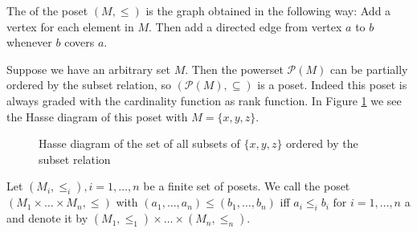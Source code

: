 \begin{defi}
	The  of the poset $(M,\leq)$ is the graph obtained in the following way: Add a vertex for each element in $M$. Then add a directed edge from vertex $a$ to $b$ whenever $b$ covers $a$.
\end{defi}

\begin{exam}
	Suppose we have an arbitrary set $M$. Then the powerset $\mathcal P (M)$ can be partially ordered by the subset relation, so $(\mathcal P (M), \subseteq)$ is a poset. Indeed this poset is always graded with the cardinality function as rank function. In Figure \ref{fig:poset-xyz-subsets} we see the Hasse diagram of this poset with $M = \{x,y,z\}$.

	\begin{figure}[ht]
		\centering
		
		\caption{Hasse diagram of the set of all subsets of $\{x,y,z\}$ ordered by the subset relation}
		\label{fig:poset-xyz-subsets}
	\end{figure}
\end{exam}

\begin{defi}
	Let $(M_i, \leq_i), i = 1,\ldots,n$ be a finite set of posets. We call the poset $(M_1 \times \ldots \times M_n,\leq)$ with $(a_1,\ldots,a_n) \leq (b_1,\ldots,b_n)$ iff $a_i \leq_i b_i \textrm{ for } i=1,\ldots,n$ a  and denote it by $(M_1, \leq_1) \times \ldots \times (M_n, \leq_n)$.
\end{defi}